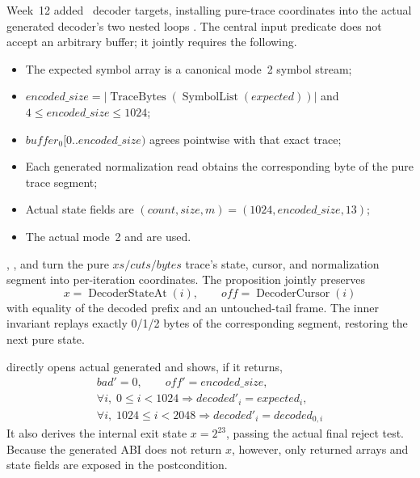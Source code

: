 Week~12 added \WeekTwelveTargetCount\ decoder targets, installing pure-trace
coordinates into the actual generated decoder's two nested loops
\cite{week12-report,rans-decoder-invariant}.
The central input predicate 
does not accept an arbitrary buffer; it jointly requires the following.

\begin{itemize}
  \item The expected symbol array is a canonical mode~2 symbol stream;
  \item \(encoded\_size=|\operatorname{TraceBytes}
        (\operatorname{SymbolList}(expected))|\) and \(4\le encoded\_size\le1024\);
  \item \(buffer_0[0..encoded\_size)\) agrees pointwise with that exact trace;
  \item Each generated normalization read obtains the corresponding byte of
        the pure trace segment;
  \item Actual state fields are \((count,size,m)=(1024,encoded\_size,13)\);
  \item The actual mode~2  and
         are used.
\end{itemize}

\begin{verified}
, , and
 turn the pure \(xs/cuts/bytes\) trace's state,
cursor, and normalization segment into per-iteration coordinates.
The proposition  jointly preserves
\[
  x=\operatorname{DecoderStateAt}(i),\qquad
  off=\operatorname{DecoderCursor}(i)
\]
with equality of the decoded prefix and an untouched-tail frame.
The inner invariant replays exactly 0/1/2 bytes of the corresponding segment,
restoring the next pure state.
\end{verified}

\begin{verified}
 directly opens actual generated
 and shows, if it returns,
\[
\begin{gathered}
  bad'=0,\qquad off'=encoded\_size,\\
  \forall i,\;0\le i<1024\Longrightarrow decoded'_i=expected_i,\\
  \forall i,\;1024\le i<2048\Longrightarrow decoded'_i=decoded_{0,i}
\end{gathered}
\]
It also derives the internal exit state \(x=2^{23}\), passing the actual final
reject test. Because the generated ABI does not return \(x\), however, only
returned arrays and state fields are exposed in the postcondition.
\end{verified}

